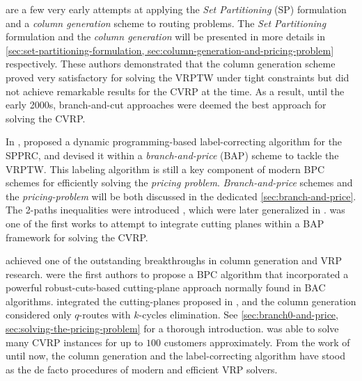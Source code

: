 \Textcite{desrosiers1984, agarwal1989setpartitioningbased}
are a few very early attempts at applying the \textit{Set Partitioning} (SP) formulation
and a \textit{column generation} scheme to routing problems.
The \textit{Set Partitioning} formulation and the \textit{column generation}
will be  presented in more details in \cref{sec:set-partitioning-formulation, sec:column-generation-and-pricing-problem}
respectively.
These authors demonstrated that the column generation scheme proved very satisfactory
for solving the VRPTW under tight constraints
but did not achieve remarkable results for the CVRP at the time.
As a result, until the early 2000s,
branch-and-cut approaches were deemed the best approach for solving the CVRP.

In \citeyear{desrochers1992}, \citeauthor{desrochers1992}
proposed a dynamic programming-based label-correcting algorithm for the SPPRC,
and devised it within a \textit{branch-and-price} (BAP) scheme to tackle the VRPTW.
This labeling algorithm is still a key component of modern BPC schemes
for efficiently solving the \textit{pricing problem}.
\textit{Branch-and-price} schemes and the \textit{pricing-problem}
will be both discussed in the dedicated \cref{sec:branch-and-price}.
The 2-paths inequalities were introduced \textcite{kohl1999},
which were later generalized in \textcite{desaulniers2008}.
\Textcite{kohl1999} was one of the first works to attempt
to integrate cutting planes within a BAP framework for solving the CVRP.

\Textcite{fukasawa2006} achieved one of the outstanding breakthroughs in column generation and VRP research.
 were the first authors to propose a BPC algorithm
that incorporated a powerful robust-cuts-based cutting-plane approach normally found in BAC algorithms.
\citeauthor{fukasawa2006} integrated the cutting-planes proposed in \cite{lysgaard2004},
and the column generation considered only $q$-routes with $k$-cycles elimination.
See \cref{sec:branch0-and-price, sec:solving-the-pricing-problem} for a thorough introduction.
\textcite{fukasawa2006} was able to solve many CVRP instances for up to $100$ customers approximately.
From the work of \citeauthor{fukasawa2006} until now,
the column generation and the label-correcting algorithm
have stood as the de facto procedures of modern and efficient VRP solvers.

